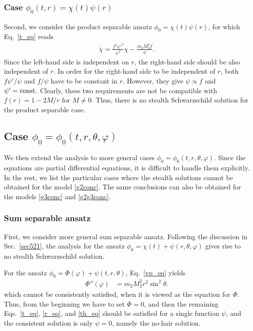 \documentclass[prd,amsmath,amssymb,floatfix,superscriptaddress,notitlepage,nofootinbib,preprintnumbers]{revtex4-1}
\begin{document}
\subsubsection{Case $\phi_0(t,r)= \chi(t)\psi(r)$} 
\label{sec522}


Second, we consider the product separable ansatz 
$\phi_0=\chi(t)\psi(r)$,
for which Eq.~\eqref{t_eq} reads
\begin{align}
 \ddot{\chi}
=\frac{f^2\psi'^2}{\psi^2}
  \chi
-\frac{m_2M_2^2f}{\psi}.
\end{align} 
Since the left-hand side is independent on $r$, the right-hand side should be also independent of $r$.
In order for the right-hand side to be independent of $r$,
both $f\psi'/\psi$ and $f/\psi$
have to be constant in $r$.
However, they give $\psi \propto f$ and $\psi'={\rm const.}$
Clearly, these two requirements are not be compatible with $f(r)=1-2M/r$ for $M\neq 0$.
Thus, there is no stealth Schwarzschild solution
for the product separable case.


\subsection{Case $\phi_0=\phi_0(t,r,\theta,\varphi)$}
\label{sec53}


We then extend the analysis to more general cases $\phi_0=\phi_0(t,r,\theta,\varphi)$.
Since the equations are partial differential equations,
it is difficult to handle them explicitly. 
In the rest, we list the particular cases
where the stealth solutions cannot be obtained
for the model \eqref{g2conc}.
The same conclusions can also be obtained for the models  
\eqref{g3conc} and \eqref{g2g3conc}.


\subsubsection{Sum separable ansatz}
\label{sec531}


First,
we consider more general sum separable ansatz.
Following the discussion in Sec.~\ref{sec521},
the analysis for the ansatz $\phi_0=\chi(t)+\psi(r,\theta,\varphi)$
gives rise to no stealth Schwarzschild solution.


For the ansatz $\phi_0=\Phi(\varphi)+\psi(t,r,\theta)$,
Eq.~\eqref{vp_eq} yields
\begin{align} 
\label{g2_sum_phi} 
\Phi''(\varphi)
&=m_2 M_2^2 r^2\sin^2\theta.
\end{align}
which cannot be consistently satisfied,
when it is viewed as the equation for $\Phi$.
Thus, from the beginning we have to set $\Phi=0$,
and then the remaining Eqs.~\eqref{t_eq}, \eqref{r_eq}, and \eqref{th_eq} 
should be satisfied for a single function $\psi$,
and the consistent solution is only $\psi=0$,
namely the no-hair solution.
\end{document}
